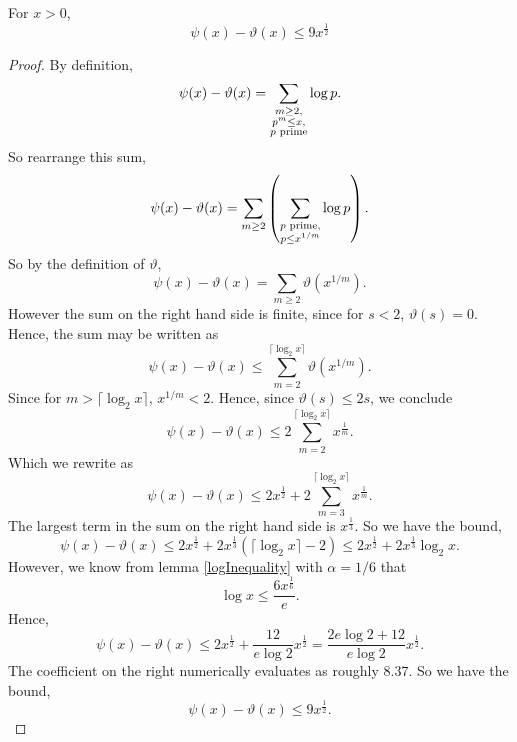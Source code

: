 \documentclass{unswmaths}
\begin{document}
\begin{theorem}
\label{psiThetaBound}
    For $x > 0$,
    \begin{equation*}
        \psi(x)-\vartheta(x) \leq 9x^{\frac{1}{2}}
    \end{equation*}
\end{theorem}
\begin{proof}
    By definition,
    \begin{equation*}
        \psi(x)-\vartheta(x) = \sum_{\substack{m\geq 2,\\ p^m \leq x,\\ {p\text{ prime}}}} \log{p}.
    \end{equation*}
    So rearrange this sum,
    \begin{equation*}
        \psi(x)-\vartheta(x) = \sum_{m\geq 2} \left(\sum_{\substack{{p\text{ prime}},\\ p\leq x^{1/m}}} \log{p}\right).
    \end{equation*}
    So by the definition of $\vartheta$,
    \begin{equation*}
        \psi(x)-\vartheta(x) = \sum_{m\geq 2} \vartheta(x^{1/m}).
    \end{equation*}
    However the sum on the right hand side is finite, since for $s < 2$, $\vartheta(s) = 0$. Hence, the sum
    may be written as
    \begin{equation*}
        \psi(x) - \vartheta(x) \leq \sum_{m=2}^{\lceil \log_2{x}\rceil} \vartheta(x^{1/m}).
    \end{equation*}
    Since for $m > \lceil \log_2{x} \rceil$, $x^{1/m} < 2$. Hence, since $\vartheta(s) \leq 2s$, we conclude
    \begin{equation*}
        \psi(x) - \vartheta(x) \leq 2\sum_{m=2}^{\lceil \log_2{x} \rceil} x^{\frac{1}{m}}.
    \end{equation*}
    Which we rewrite as 
    \begin{equation*}
        \psi(x) - \vartheta(x) \leq 2x^{\frac{1}{2}} + 2\sum_{m=3}^{\lceil \log_2{x} \rceil} x^{\frac{1}{m}}.
    \end{equation*}
    The largest term in the sum on the right hand side is $x^{\frac{1}{3}}$. So we have the bound,
    \begin{equation*}
        \psi(x) - \vartheta(x) \leq 2x^{\frac{1}{2}}+2x^{\frac{1}{3}}(\lceil \log_2{x} \rceil - 2) \leq 2x^{\frac{1}{2}} + 2x^{\frac{1}{3}} \log_2{x}.
    \end{equation*}
    However, we know from lemma \ref{logInequality} with $\alpha = 1/6$ that
    \begin{equation*}
        \log{x} \leq \frac{6x^{\frac{1}{6}}}{e}.
    \end{equation*}
    Hence,
    \begin{equation*}
        \psi(x) - \vartheta(x) \leq 2x^{\frac{1}{2}}+\frac{12}{e\log{2}}x^\frac{1}{2}  = \frac{2e\log{2}+12}{e\log{2}}x^\frac{1}{2}.
    \end{equation*}
    The coefficient on the right numerically evaluates as roughly $8.37$. So we have the bound,
    \begin{equation*}
        \psi(x) - \vartheta(x) \leq 9x^\frac{1}{2}.
    \end{equation*}
\end{proof}
\end{document}
